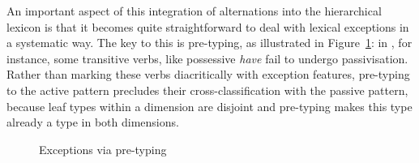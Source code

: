 \documentclass[output=paper,biblatex,babelshorthands,newtxmath,draftmode,colorlinks,citecolor=brown]{langscibook}
\begin{document}
An important aspect of this integration of alternations into the
hierarchical lexicon is that it becomes quite straightforward to deal
with lexical exceptions in a systematic way. The key to this is
pre-typing, as illustrated in Figure~\ref{fig:KoenigPre}: in , for instance, some transitive verbs, like
possessive \textit{have} fail to undergo passivisation. Rather than
marking these verbs diacritically with exception features, pre-typing to the
active pattern precludes their cross-classification with the passive
pattern, because leaf types within a dimension are disjoint and
pre-typing makes this type already a type in both dimensions.

\begin{figure}
  \centering




  \caption{Exceptions via pre-typing}
  \label{fig:KoenigPre}
\end{figure}
\end{document}
